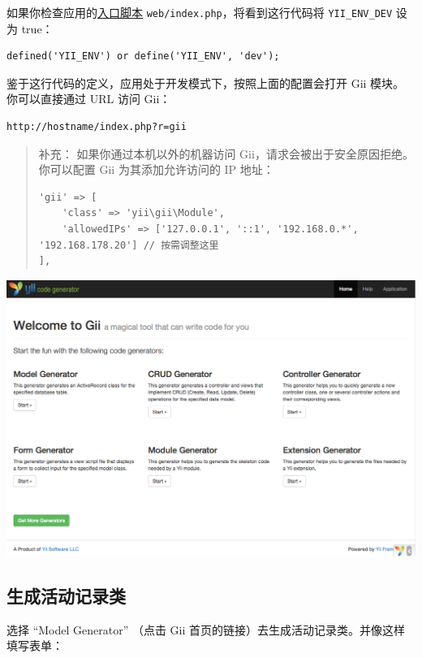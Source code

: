 如果你检查应用的\hyperref[structure-entry-scripts.md]{入口脚本} \lstinline|web/index.php|，将看到这行代码将 \lstinline|YII_ENV_DEV| 设为 true：

\lstset{language=php}\begin{lstlisting}
defined('YII_ENV') or define('YII_ENV', 'dev');
\end{lstlisting}
鉴于这行代码的定义，应用处于开发模式下，按照上面的配置会打开 Gii 模块。你可以直接通过 URL 访问 Gii：

\begin{lstlisting}
http://hostname/index.php?r=gii
\end{lstlisting}
\begin{quote}补充： 如果你通过本机以外的机器访问 Gii，请求会被出于安全原因拒绝。你可以配置 Gii 为其添加允许访问的 IP 地址：

\lstset{language=php}\begin{lstlisting}
'gii' => [
    'class' => 'yii\gii\Module',
    'allowedIPs' => ['127.0.0.1', '::1', '192.168.0.*', '192.168.178.20'] // 按需调整这里
],
\end{lstlisting}
\end{quote}
\noindent\includegraphics[width=\textwidth]{images/start-gii.png}

\subsection{生成活动记录类 \label{start-gii.md::generating-ar}}
选择 “Model Generator” （点击 Gii 首页的链接）去生成活动记录类。并像这样填写表单：

